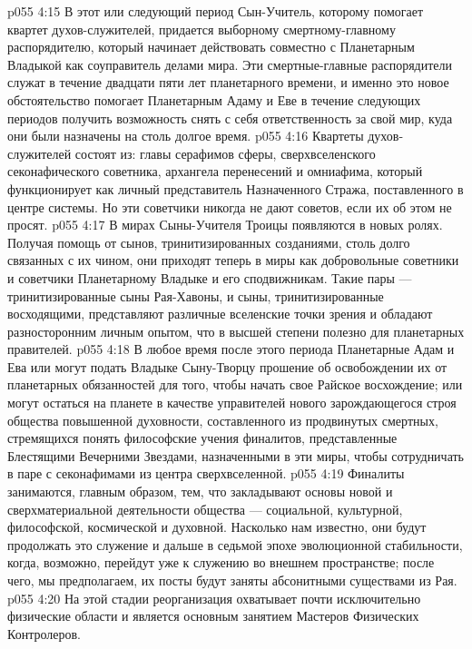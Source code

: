 \vs p055 4:15 В этот или следующий период Сын\hyp{}Учитель, которому помогает квартет духов\hyp{}служителей, придается выборному смертному\hyp{}главному распорядителю, который начинает действовать совместно с Планетарным Владыкой как соуправитель делами мира. Эти смертные\hyp{}главные распорядители служат в течение двадцати пяти лет планетарного времени, и именно это новое обстоятельство помогает Планетарным Адаму и Еве в течение следующих периодов получить возможность снять с себя ответственность за свой мир, куда они были назначены на столь долгое время.
\vs p055 4:16 Квартеты духов\hyp{}служителей состоят из: главы серафимов сферы, сверхвселенского секонафического советника, архангела перенесений и омниафима, который функционирует как личный представитель Назначенного Стража, поставленного в центре системы. Но эти советчики никогда не дают советов, если их об этом не просят.
\vs p055 4:17 \bibnobreakspace {} В мирах Сыны\hyp{}Учителя Троицы появляются в новых ролях. Получая помощь от сынов, тринитизированных созданиями, столь долго связанных с их чином, они приходят теперь в миры как добровольные советники и советчики Планетарному Владыке и его сподвижникам. Такие пары --- тринитизированные сыны Рая\hyp{}Хавоны, и сыны, тринитизированные восходящими, представляют различные вселенские точки зрения и обладают разносторонним личным опытом, что в высшей степени полезно для планетарных правителей.
\vs p055 4:18 В любое время после этого периода Планетарные Адам и Ева или могут подать Владыке Сыну\hyp{}Творцу прошение об освобождении их от планетарных обязанностей для того, чтобы начать свое Райское восхождение; или могут остаться на планете в качестве управителей нового зарождающегося строя общества повышенной духовности, составленного из продвинутых смертных, стремящихся понять философские учения финалитов, представленные Блестящими Вечерними Звездами, назначенными в эти миры, чтобы сотрудничать в паре с секонафимами из центра сверхвселенной.
\vs p055 4:19 Финалиты занимаются, главным образом, тем, что закладывают основы новой и сверхматериальной деятельности общества --- социальной, культурной, философской, космической и духовной. Насколько нам известно, они будут продолжать это служение и дальше в седьмой эпохе эволюционной стабильности, когда, возможно, перейдут уже к служению во внешнем пространстве; после чего, мы предполагаем, их посты будут заняты абсонитными существами из Рая.
\vs p055 4:20 \bibnobreakspace {} На этой стадии реорганизация охватывает почти исключительно физические области и является основным занятием Мастеров Физических Контролеров.

